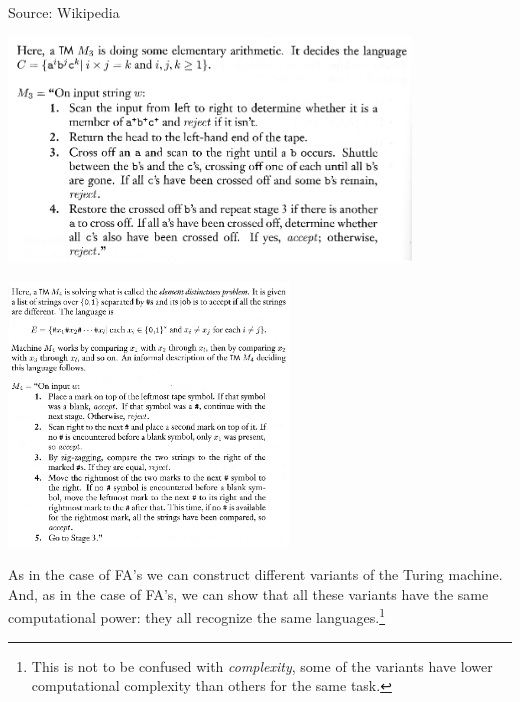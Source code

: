 \documentclass[a4paper,blends,pdf,colorBG,slideColor]{prosper}
\begin{document}
\vspace{.2in}
\vspace{.5in}
{\small Source: Wikipedia}

\es

\begin{center}
\includegraphics[height=60mm]{images/tm-example_0001.eps}
\end{center}
\es

\begin{center}
\includegraphics[height=70mm]{images/tm-example_0002.eps}
\end{center}
\es

As in the case of FA's we can construct different variants of the Turing machine. And, as
in the case of FA's, we can show that all these variants have the same computational 
power: they all recognize the same languages.\footnote{This is not to be confused with 
{\em complexity}, some of the variants have lower computational complexity than others 
for the same task.}
\end{document}
